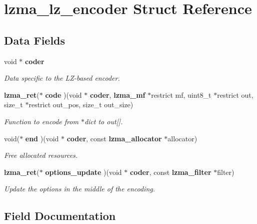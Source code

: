 \section{lzma\+\_\+lz\+\_\+encoder Struct Reference}
\label{structlzma__lz__encoder}
\subsection*{Data Fields}
\begin{DoxyCompactItemize}
\item 
void $\ast$ \textbf{ coder}
\begin{DoxyCompactList}\small\item\em Data specific to the L\+Z-\/based encoder. \end{DoxyCompactList}\item 
\textbf{ lzma\+\_\+ret}($\ast$ \textbf{ code} )(void $\ast$\textbf{ coder}, \textbf{ lzma\+\_\+mf} $\ast$restrict mf, uint8\+\_\+t $\ast$restrict out, size\+\_\+t $\ast$restrict out\+\_\+pos, size\+\_\+t out\+\_\+size)
\begin{DoxyCompactList}\small\item\em Function to encode from $\ast$dict to out[]. \end{DoxyCompactList}\item 
void($\ast$ \textbf{ end} )(void $\ast$\textbf{ coder}, const \textbf{ lzma\+\_\+allocator} $\ast$allocator)
\begin{DoxyCompactList}\small\item\em Free allocated resources. \end{DoxyCompactList}\item 
\textbf{ lzma\+\_\+ret}($\ast$ \textbf{ options\+\_\+update} )(void $\ast$\textbf{ coder}, const \textbf{ lzma\+\_\+filter} $\ast$filter)
\begin{DoxyCompactList}\small\item\em Update the options in the middle of the encoding. \end{DoxyCompactList}\end{DoxyCompactItemize}


\subsection{Field Documentation}
\mbox{\label{structlzma__lz__encoder_aa7163d664cb708fb59ea10b78e6865a1}} 

